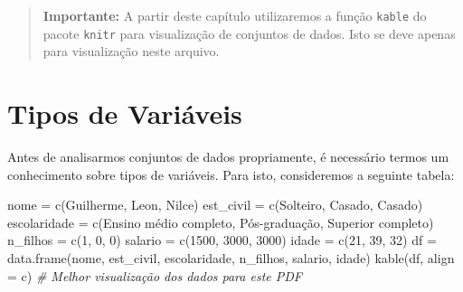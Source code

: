 \documentclass[
]{book}
\newenvironment{Shaded}{\begin{snugshade}}{\end{snugshade}}
\newcommand{\AttributeTok}[1]{\textcolor[rgb]{0.77,0.63,0.00}{#1}}
\newcommand{\CommentTok}[1]{\textcolor[rgb]{0.56,0.35,0.01}{\textit{#1}}}
\newcommand{\DecValTok}[1]{\textcolor[rgb]{0.00,0.00,0.81}{#1}}
\newcommand{\FunctionTok}[1]{\textcolor[rgb]{0.00,0.00,0.00}{#1}}
\newcommand{\NormalTok}[1]{#1}
\newcommand{\OtherTok}[1]{\textcolor[rgb]{0.56,0.35,0.01}{#1}}
\newcommand{\StringTok}[1]{\textcolor[rgb]{0.31,0.60,0.02}{#1}}
\begin{document}
\begin{quote}
\textbf{Importante:} A partir deste capítulo utilizaremos a função \texttt{kable} do pacote \texttt{knitr} para visualização de conjuntos de dados. Isto se deve apenas para visualização neste arquivo.
\end{quote}

\hypertarget{tipos-de-variuxe1veis}{%
\section{Tipos de Variáveis}\label{tipos-de-variuxe1veis}}

Antes de analisarmos conjuntos de dados propriamente, é necessário termos um conhecimento sobre tipos de variáveis. Para isto, consideremos a seguinte tabela:

\begin{Shaded}
\begin{Highlighting}[]
\NormalTok{nome }\OtherTok{=} \FunctionTok{c}\NormalTok{(}\StringTok{\textquotesingle{}Guilherme\textquotesingle{}}\NormalTok{, }\StringTok{\textquotesingle{}Leon\textquotesingle{}}\NormalTok{, }\StringTok{\textquotesingle{}Nilce\textquotesingle{}}\NormalTok{)}
\NormalTok{est\_civil }\OtherTok{=} \FunctionTok{c}\NormalTok{(}\StringTok{\textquotesingle{}Solteiro\textquotesingle{}}\NormalTok{, }\StringTok{\textquotesingle{}Casado\textquotesingle{}}\NormalTok{, }\StringTok{\textquotesingle{}Casado\textquotesingle{}}\NormalTok{)}
\NormalTok{escolaridade }\OtherTok{=} \FunctionTok{c}\NormalTok{(}\StringTok{\textquotesingle{}Ensino médio completo\textquotesingle{}}\NormalTok{,}
                 \StringTok{\textquotesingle{}Pós{-}graduação\textquotesingle{}}\NormalTok{,}
                 \StringTok{\textquotesingle{}Superior completo\textquotesingle{}}\NormalTok{)}
\NormalTok{n\_filhos }\OtherTok{=} \FunctionTok{c}\NormalTok{(}\DecValTok{1}\NormalTok{, }\DecValTok{0}\NormalTok{, }\DecValTok{0}\NormalTok{)}
\NormalTok{salario }\OtherTok{=} \FunctionTok{c}\NormalTok{(}\DecValTok{1500}\NormalTok{, }\DecValTok{3000}\NormalTok{, }\DecValTok{3000}\NormalTok{)}
\NormalTok{idade }\OtherTok{=} \FunctionTok{c}\NormalTok{(}\DecValTok{21}\NormalTok{, }\DecValTok{39}\NormalTok{, }\DecValTok{32}\NormalTok{)}
\NormalTok{df }\OtherTok{=} \FunctionTok{data.frame}\NormalTok{(nome, est\_civil, escolaridade, n\_filhos, salario, idade)}
\FunctionTok{kable}\NormalTok{(df, }\AttributeTok{align =} \StringTok{\textquotesingle{}c\textquotesingle{}}\NormalTok{) }\CommentTok{\# Melhor visualização dos dados para este PDF}
\end{Highlighting}
\end{Shaded}
\end{document}
